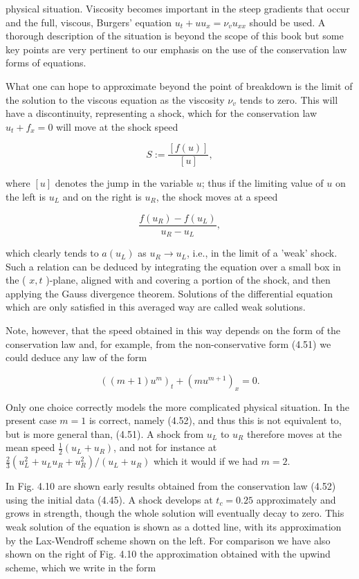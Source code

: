 \documentclass[10pt]{article}
\begin{document}
physical situation. Viscosity becomes important in the steep gradients that occur and the full, viscous, Burgers' equation \(u_{t}+u u_{x}=\nu_{v} u_{x x}\) should be used. A thorough description of the situation is beyond the scope of this book but some key points are very pertinent to our emphasis on the use of the conservation law forms of equations.

What one can hope to approximate beyond the point of breakdown is the limit of the solution to the viscous equation as the viscosity \(\nu_{v}\) tends to zero. This will have a discontinuity, representing a shock, which for the conservation law \(u_{t}+f_{x}=0\) will move at the shock speed

\[
S:=\frac{[f(u)]}{[u]},
\]

where \([u]\) denotes the jump in the variable \(u\); thus if the limiting value of \(u\) on the left is \(u_{L}\) and on the right is \(u_{R}\), the shock moves at a speed

\[
\frac{f\left(u_{R}\right)-f\left(u_{L}\right)}{u_{R}-u_{L}},
\]

which clearly tends to \(a\left(u_{L}\right)\) as \(u_{R} \rightarrow u_{L}\), i.e., in the limit of a 'weak' shock. Such a relation can be deduced by integrating the equation over a small box in the ( \(x, t\) )-plane, aligned with and covering a portion of the shock, and then applying the Gauss divergence theorem. Solutions of the differential equation which are only satisfied in this averaged way are called weak solutions.

Note, however, that the speed obtained in this way depends on the form of the conservation law and, for example, from the non-conservative form (4.51) we could deduce any law of the form

\[
\left((m+1) u^{m}\right)_{t}+\left(m u^{m+1}\right)_{x}=0 .
\]

Only one choice correctly models the more complicated physical situation. In the present case \(m=1\) is correct, namely (4.52), and thus this is not equivalent to, but is more general than, (4.51). A shock from \(u_{L}\) to \(u_{R}\) therefore moves at the mean speed \(\frac{1}{2}\left(u_{L}+u_{R}\right)\), and not for instance at \(\frac{2}{3}\left(u_{L}^{2}+u_{L} u_{R}+u_{R}^{2}\right) /\left(u_{L}+u_{R}\right)\) which it would if we had \(m=2\).

In Fig. 4.10 are shown early results obtained from the conservation law (4.52) using the initial data (4.45). A shock develops at \(t_{c}=0.25\) approximately and grows in strength, though the whole solution will eventually decay to zero. This weak solution of the equation is shown as a dotted line, with its approximation by the Lax-Wendroff scheme shown on the left. For comparison we have also shown on the right of Fig. 4.10 the approximation obtained with the upwind scheme, which we write in the form
\end{document}
